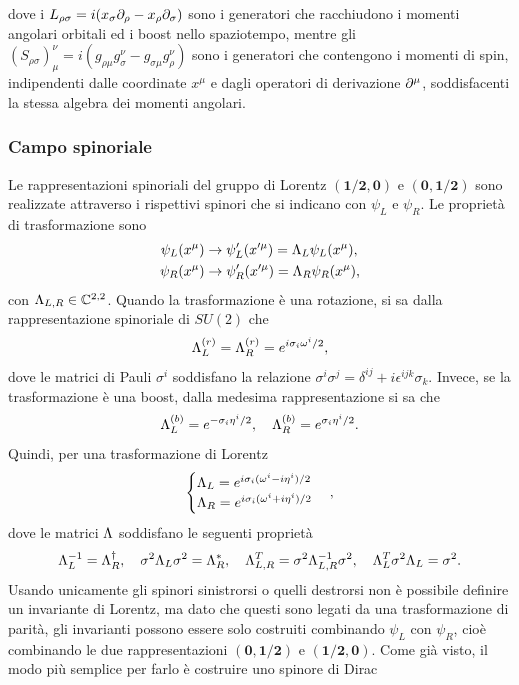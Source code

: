 dove i $L_{\rho\sigma} = i(x_\sigma\partial_\rho - x_\rho\partial_\sigma)$ sono i generatori che racchiudono i momenti angolari orbitali ed i boost nello spaziotempo, mentre gli $(S_{\rho\sigma})^\nu_\mu = i(g_{\rho\mu}g^\nu_\sigma - g_{\sigma\mu}g^\nu_\rho)$ sono i generatori che contengono i momenti di spin, indipendenti dalle coordinate $x^\mu$ e dagli operatori di derivazione $\partial^\mu$, soddisfacenti la stessa algebra dei momenti angolari. 

\subsubsection{Campo spinoriale}
Le rappresentazioni spinoriali del gruppo di Lorentz $\bm{(1/2,0)}$ e $\bm{(0,1/2)}$ sono realizzate attraverso i rispettivi spinori che si indicano con $\psi_L$ e $\psi_R$. Le proprietà di trasformazione sono
\begin{align}
    \psi_L(x^\mu) &\to \psi_L'(x'^\mu) = \Lambda_L\psi_L(x^\mu), \\
    \psi_R(x^\mu) &\to \psi_R'(x'^\mu) = \Lambda_R\psi_R(x^\mu),
\end{align}
con $\Lambda_{L,R}\in\mathbb{C}^{2,2}$. Quando la trasformazione è una rotazione, si sa dalla rappresentazione spinoriale di $SU(2)$ che
\begin{equation}
    \Lambda_L^{(r)} = \Lambda_R^{(r)} = e^{i\sigma_i\omega^i/2},
\end{equation}
dove le matrici di Pauli $\sigma^i$ soddisfano la relazione $\sigma^i\sigma^j = \delta^{ij} + i\epsilon^{ijk}\sigma_k$. Invece, se la trasformazione è una boost, dalla medesima rappresentazione si sa che
\begin{equation}
    \Lambda^{(b)}_L = e^{-\sigma_i\eta^i/2},\quad\Lambda_R^{(b)} = e^{\sigma_i\eta^i/2}.
\end{equation}
Quindi, per una trasformazione di Lorentz
\begin{equation}
    \begin{cases}
        \Lambda_L = e^{i\sigma_i(\omega^i - i\eta^i)/2} \\
        \Lambda_R = e^{i\sigma_i(\omega^i + i\eta^i)/2}
    \end{cases},
\end{equation}
dove le matrici $\Lambda$ soddisfano le seguenti proprietà
\begin{equation}
    \Lambda_L^{-1} = \Lambda_R^\dagger,\quad\sigma^2\Lambda_L\sigma^2 = \Lambda_R^*,\quad\Lambda_{L,R}^T = \sigma^2\Lambda_{L,R}^{-1}\sigma^2,\quad\Lambda_L^T\sigma^2\Lambda_L = \sigma^2.
\end{equation}
Usando unicamente gli spinori sinistrorsi o quelli destrorsi non è possibile definire un invariante di Lorentz, ma dato che questi sono legati da una trasformazione di parità, gli invarianti possono essere solo costruiti combinando $\psi_L$ con $\psi_R$, cioè combinando le due rappresentazioni $\bm{(0,1/2)}$ e $\bm{(1/2,0)}$. Come già visto, il modo più semplice per farlo è costruire uno spinore di Dirac
